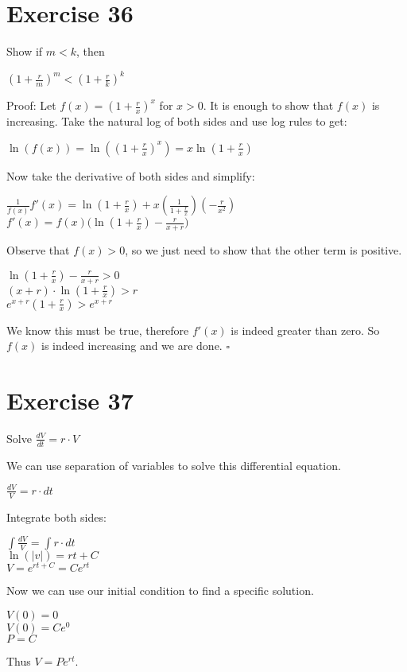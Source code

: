 \documentclass{article}
\begin{document}
\section*{Exercise 36}
Show if $m < k$, then
\begin{center}
    $(1 + \frac{r}{m})^m < (1 + \frac{r}{k})^k$
\end{center}
\begin{flushleft}
    Proof: Let $f(x) = (1 + \frac{r}{x})^x$ for $x > 0$. It is enough to show that $f(x)$ is increasing. Take the natural log of both sides and use log rules to get:
    \begin{center}
        $\ln(f(x)) = \ln((1 + \frac{r}{x})^x) = x\ln(1 + \frac{r}{x})$
    \end{center}
    Now take the derivative of both sides and simplify:
    \begin{center}
        $\frac{1}{f(x)} f'(x) = \ln(1 + \frac{r}{x}) + x(\frac{1}{1+\frac{r}{x}})(-\frac{r}{x^2})$ \\
        $f'(x) = f(x) \big(\ln(1 + \frac{r}{x}) - \frac{r}{x+r}\big)$
    \end{center}
    Observe that $f(x) > 0$, so we just need to show that the other term is positive.
    \begin{center}
        $\ln(1 + \frac{r}{x}) - \frac{r}{x+r} > 0$ \\
        $(x + r) \cdot \ln(1 + \frac{r}{x}) > r$ \\
        $e^{x+r} (1 + \frac{r}{x}) > e^{x+r}$
    \end{center}
    We know this must be true, therefore $f'(x)$ is indeed greater than zero. So $f(x)$ is indeed increasing and we are done. $\square$
\end{flushleft}

\section*{Exercise 37}
Solve $\frac{dV}{dt} = r \cdot V$
\begin{flushleft}
    We can use separation of variables to solve this differential equation.
    \begin{center}
        $\frac{dV}{V} = r \cdot dt$
    \end{center}
    Integrate both sides:
    \begin{center}
        $\int \frac{dV}{V} = \int r \cdot dt$ \\
        $\ln(|v|) = rt + C$ \\
        $V = e^{rt + C} = Ce^{rt}$
    \end{center}
    Now we can use our initial condition to find a specific solution.
    \begin{center}
        $V(0) = 0$ \\
        $V(0) = Ce^0$ \\
        $P = C$
    \end{center}
    Thus $V = Pe^{rt}$.
\end{flushleft}
\end{document}
